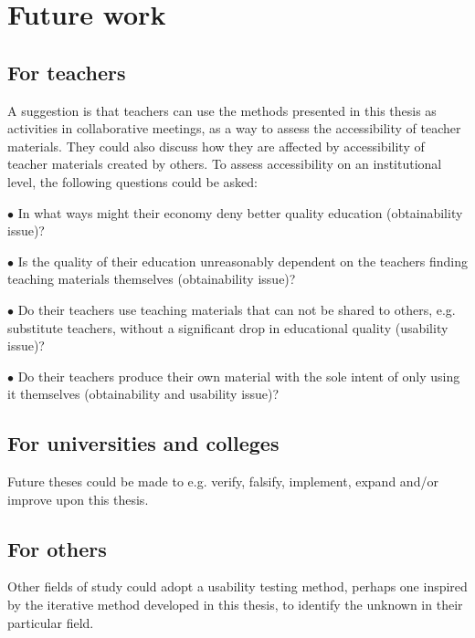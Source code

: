 \section{Future work}
\subsection{For teachers}
A suggestion is that teachers can use the methods presented in this thesis as activities in collaborative meetings, as a way to assess the accessibility of teacher materials. They could also discuss how they are affected by accessibility of teacher materials created by others. To assess accessibility on an institutional level, the following questions could be asked:
\begin{description}
\item $\bullet$ In what ways might their economy deny better quality education (obtainability issue)? 
\item $\bullet$ Is the quality of their education unreasonably dependent on the teachers finding teaching materials themselves (obtainability issue)? 
\item $\bullet$ Do their teachers use teaching materials that can not be shared to others, e.g. substitute teachers, without a significant drop in educational quality (usability issue)?
\item $\bullet$ Do their teachers produce their own material with the sole intent of only using it themselves (obtainability and usability issue)?
\end{description}
\subsection{For universities and colleges}
Future theses could be made to e.g. verify, falsify, implement, expand and/or improve upon this thesis.
\subsection{For others}
Other fields of study could adopt a usability testing method, perhaps one inspired by the iterative method developed in this thesis, to identify the unknown in their particular field. 
